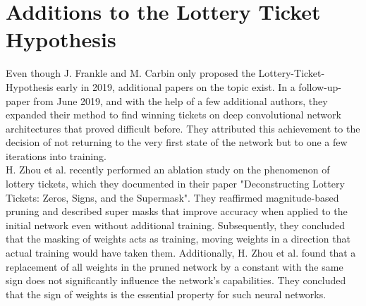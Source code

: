 \section{Additions to the Lottery Ticket Hypothesis}
Even though J. Frankle and M. Carbin only proposed the Lottery-Ticket-Hypothesis early in 2019, additional papers on the topic exist. In a follow-up-paper from June 2019, and with the help of a few additional authors, they expanded their method to find winning tickets on deep convolutional network architectures that proved difficult before. They attributed this achievement to the decision of not returning to the very first state of the network but to one a few iterations into training.\cite{LTH-At-Scale}\\
H. Zhou et al. recently performed an ablation study on the phenomenon of lottery tickets, which they documented in their paper "Deconstructing Lottery Tickets: Zeros, Signs, and the Supermask".
They reaffirmed magnitude-based pruning and described super masks that improve accuracy when applied to the initial network even without additional training. Subsequently, they concluded that the masking of weights acts as training, moving weights in a direction that actual training would have taken them. Additionally, H. Zhou et al. found that a replacement of all weights in the pruned network by a constant with the same sign does not significantly influence the network's capabilities. They concluded that the sign of weights is the essential property for such neural networks.\cite{Deconstructing_LTH}
